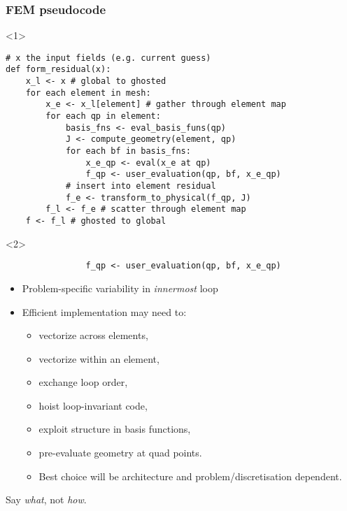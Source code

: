 \documentclass[presentation]{beamer}
\begin{document}
\begin{frame}[fragile]
  \frametitle{FEM pseudocode}
  \begin{onlyenv}<1>
\begin{verbatim}
# x the input fields (e.g. current guess)
def form_residual(x):
    x_l <- x # global to ghosted
    for each element in mesh:
        x_e <- x_l[element] # gather through element map
        for each qp in element:
            basis_fns <- eval_basis_funs(qp)
            J <- compute_geometry(element, qp)
            for each bf in basis_fns:
                x_e_qp <- eval(x_e at qp)
                f_qp <- user_evaluation(qp, bf, x_e_qp)
            # insert into element residual
            f_e <- transform_to_physical(f_qp, J)
        f_l <- f_e # scatter through element map
    f <- f_l # ghosted to global
\end{verbatim}
  \end{onlyenv}

  \begin{onlyenv}<2>
\begin{verbatim}
                f_qp <- user_evaluation(qp, bf, x_e_qp)
\end{verbatim}
    \begin{itemize}
    \item Problem-specific variability in \emph{innermost} loop
    \item Efficient implementation may need to:
      \begin{itemize}
      \item vectorize across elements,
      \item vectorize within an element,
      \item exchange loop order,
      \item hoist loop-invariant code,
      \item exploit structure in basis functions,
      \item pre-evaluate geometry at quad points.
      \item Best choice will be architecture and
        problem/discretisation dependent.
      \end{itemize}
    \end{itemize}
  \end{onlyenv}
\end{frame}

\begin{frame}[standout]
  Say \emph{what}, not \emph{how}.
\end{frame}
\end{document}
